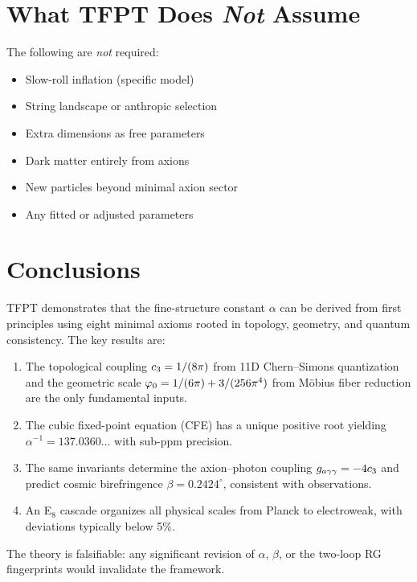 \section{What TFPT Does \emph{Not} Assume}

The following are \emph{not} required:
\begin{itemize}[leftmargin=2em]
    \item[\ding{55}] Slow-roll inflation (specific model)
    \item[\ding{55}] String landscape or anthropic selection
    \item[\ding{55}] Extra dimensions as free parameters
    \item[\ding{55}] Dark matter entirely from axions
    \item[\ding{55}] New particles beyond minimal axion sector
    \item[\ding{55}] Any fitted or adjusted parameters
\end{itemize}

\section{Conclusions}

TFPT demonstrates that the fine-structure constant $\alpha$ can be derived 
from first principles using eight minimal axioms rooted in topology, geometry, 
and quantum consistency. The key results are:

\begin{enumerate}
    \item The topological coupling $c_3 = 1/(8\pi)$ from 11D Chern--Simons 
        quantization and the geometric scale $\varphi_0 = 1/(6\pi) + 3/(256\pi^4)$ 
        from M\"obius fiber reduction are the only fundamental inputs.
    
    \item The cubic fixed-point equation (CFE) has a unique positive root 
        yielding $\alpha^{-1} = 137.0360\ldots$ with sub-ppm precision.
    
    \item The same invariants determine the axion--photon coupling 
        $g_{a\gamma\gamma} = -4c_3$ and predict cosmic birefringence 
        $\beta = 0.2424^\circ$, consistent with observations.
    
    \item An E$_8$ cascade organizes all physical scales from Planck to 
        electroweak, with deviations typically below 5\%.
\end{enumerate}

The theory is falsifiable: any significant revision of $\alpha$, $\beta$, 
or the two-loop RG fingerprints would invalidate the framework.

\appendix
